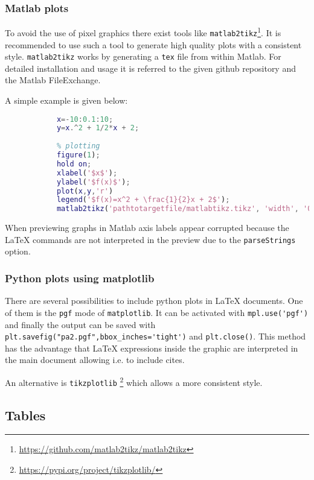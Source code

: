 		\subsubsection{Matlab plots}
		
		To avoid the use of pixel graphics there exist tools like \texttt{matlab2tikz}\footnote{\url{https://github.com/matlab2tikz/matlab2tikz}}. It is recommended to use such a tool to generate high quality plots with a consistent style. \texttt{matlab2tikz} works by generating a \texttt{tex} file from within Matlab. For detailed installation and usage it is referred to the given github repository and the Matlab FileExchange.
		
		A simple example is given below:
		
		\begin{lstlisting}[language=Matlab]
			% generate x and y data
			x=-10:0.1:10;
			y=x.^2 + 1/2*x + 2;
			
			% plotting
			figure(1);
			hold on;
			xlabel('$x$');
			ylabel('$f(x)$');
			plot(x,y,'r')
			legend('$f(x)=x^2 + \frac{1}{2}x + 2$');
			matlab2tikz('pathtotargetfile/matlabtikz.tikz', 'width', '0.5\textwidth', 'parseStrings', false);
		\end{lstlisting}
	
		When previewing graphs in Matlab axis labels appear corrupted because the {\LaTeX} commands are not interpreted in the preview due to the \texttt{parseStrings} option. 
		
		\subsubsection{Python plots using matplotlib}
		
		There are several possibilities to include python plots in {\LaTeX} documents. One of them is the \texttt{pgf} mode of \texttt{matplotlib}. It can be activated with \verb|mpl.use('pgf')| and finally the output can be saved with \verb|plt.savefig("pa2.pgf",bbox_inches='tight')| and \verb|plt.close()|. This method has the advantage that {\LaTeX} expressions inside the graphic are interpreted in the main document allowing i.e. to include cites.
		
		An alternative is \texttt{tikzplotlib} \footnote{\url{https://pypi.org/project/tikzplotlib/}} which allows a more consistent style.
		
	\subsection{Tables}
	
